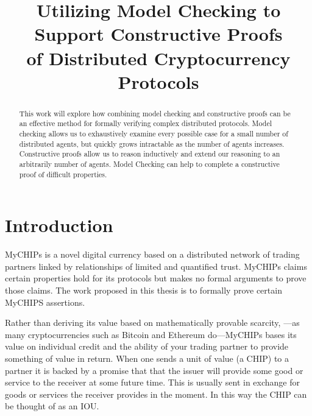 \documentclass[article, onecolumn, 12pt]{IEEEtran}
\begin{document}
\title{Utilizing Model Checking to Support Constructive Proofs\\
of Distributed Cryptocurrency Protocols}

\author{
}

\maketitle

\begin{abstract}
This work will explore how combining model checking and constructive proofs can be an effective method for formally verifying complex distributed protocols. Model checking allows us to exhaustively examine every possible case for a small number of distributed agents, but quickly grows intractable as the number of agents increases. Constructive proofs allow us to reason inductively and extend our reasoning to an arbitrarily number of agents. Model Checking can help to complete a constructive proof of difficult properties.
\end{abstract}

\section{Introduction}
MyCHIPs is a novel digital currency based on a distributed network of trading partners linked by relationships of limited and quantified trust.  MyCHIPs claims certain properties hold for its protocols but makes no formal arguments to prove those claims. The work proposed in this thesis is to formally prove certain MyCHIPS assertions.

Rather than deriving its value based on mathematically provable scarcity, ---as many cryptocurrencies such as Bitcoin and Ethereum do---MyCHIPs bases its value on individual credit and the ability of your trading partner to provide something of value in return. When one sends a unit of value (a CHIP) to a partner it is backed by a promise that that the issuer will provide some good or service to the receiver at some future time. This is usually sent in exchange for goods or services the receiver provides in the moment. In this way the CHIP can be thought of as an IOU. 
\end{document}
